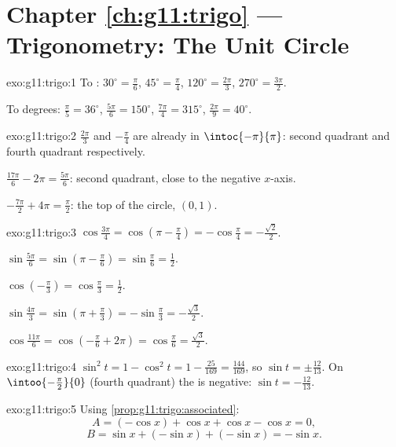 \section*{Chapter \ref{ch:g11:trigo} --- Trigonometry: The Unit Circle}

\begin{solution}{exo:g11:trigo:1}
To : $30^\circ = \frac{\pi}{6}$, $45^\circ = \frac{\pi}{4}$,
$120^\circ = \frac{2\pi}{3}$, $270^\circ = \frac{3\pi}{2}$.

To degrees: $\frac{\pi}{5} = 36^\circ$, $\frac{5\pi}{6} = 150^\circ$,
$\frac{7\pi}{4} = 315^\circ$, $\frac{2\pi}{9} = 40^\circ$.
\end{solution}

\begin{solution}{exo:g11:trigo:2}
$\frac{2\pi}{3}$ and $-\frac{\pi}{4}$ are already in
$\intoc{-\pi}{\pi}$: second quadrant and fourth quadrant respectively.

$\frac{17\pi}{6} - 2\pi = \frac{5\pi}{6}$: second quadrant, close to the
negative $x$-axis.

$-\frac{7\pi}{2} + 4\pi = \frac{\pi}{2}$: the top of the circle,
$(0, 1)$.
\end{solution}

\begin{solution}{exo:g11:trigo:3}
$\cos\frac{3\pi}{4} = \cos\left(\pi - \frac\pi4\right)
= -\cos\frac\pi4 = -\frac{\sqrt2}{2}$.

$\sin\frac{5\pi}{6} = \sin\left(\pi - \frac\pi6\right)
= \sin\frac\pi6 = \frac12$.

$\cos\left(-\frac\pi3\right) = \cos\frac\pi3 = \frac12$.

$\sin\frac{4\pi}{3} = \sin\left(\pi + \frac\pi3\right)
= -\sin\frac\pi3 = -\frac{\sqrt3}{2}$.

$\cos\frac{11\pi}{6} = \cos\left(-\frac\pi6 + 2\pi\right)
= \cos\frac\pi6 = \frac{\sqrt3}{2}$.
\end{solution}

\begin{solution}{exo:g11:trigo:4}
$\sin^2 t = 1 - \cos^2 t = 1 - \frac{25}{169} = \frac{144}{169}$, so
$\sin t = \pm\frac{12}{13}$. On $\intoo{-\frac\pi2}{0}$ (fourth quadrant)
the  is negative: $\sin t = -\frac{12}{13}$.
\end{solution}

\begin{solution}{exo:g11:trigo:5}
Using \cref{prop:g11:trigo:associated}:
\[
A = (-\cos x) + \cos x + \cos x - \cos x = 0 ,
\]
\[
B = \sin x + (-\sin x) + (-\sin x) = -\sin x .
\]
\end{solution}

